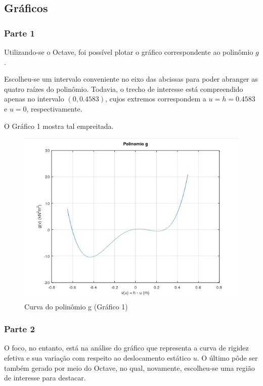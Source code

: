 \documentclass[a4paper, 12pt]{article}
\begin{document}
	\newpage
	
	\subsection{Gráficos}
	
	\subsubsection{Parte 1}
	
	Utilizando-se o Octave, foi possível plotar o gráfico correspondente ao polinômio $g$. 
	
	Escolheu-se um intervalo 
	conveniente no eixo das abcissas para poder abranger as quatro raízes do polinômio. Todavia, o trecho de interesse
	está compreendido apenas no intervalo $(0,0.4583)$, cujos extremos correspondem a $u=h=0.4583$ e $u=0$, respectivamente.
	
	O Gráfico 1 mostra tal empreitada.
	
	\begin{figure}[!htb]
		\centering
		\includegraphics[scale=1]{g1.png}
		\caption{Curva do polinômio g (Gráfico 1)}
	\end{figure}
	
	\subsubsection{Parte 2}
	
	O foco, no entanto, está na análise do gráfico que representa a curva de rigidez efetiva e sua variação com respeito 
	ao deslocamento	estático $u$. O último pôde ser também gerado por meio do Octave, no qual, novamente, escolheu-se uma 
	região de interesse	para destacar.
	
\end{document}
